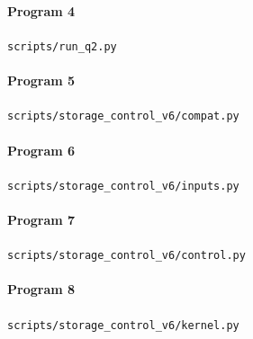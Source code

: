 


\paragraph*{Program 4} \nolinkurl{scripts/run_q2.py}




\paragraph*{Program 5} \nolinkurl{scripts/storage_control_v6/compat.py}




\paragraph*{Program 6} \nolinkurl{scripts/storage_control_v6/inputs.py}




\paragraph*{Program 7} \nolinkurl{scripts/storage_control_v6/control.py}




\paragraph*{Program 8} \nolinkurl{scripts/storage_control_v6/kernel.py}




